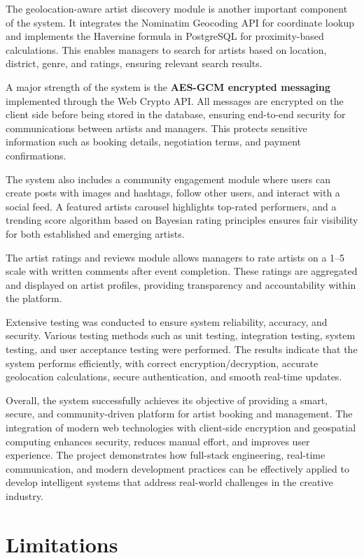 \documentclass[12pt,a4paper]{report}
\begin{document}
The geolocation-aware artist discovery module is another important component of the system. It integrates the Nominatim Geocoding API for coordinate lookup and implements the Haversine formula in PostgreSQL for proximity-based calculations. This enables managers to search for artists based on location, district, genre, and ratings, ensuring relevant search results.

A major strength of the system is the \textbf{AES-GCM encrypted messaging} implemented through the Web Crypto API. All messages are encrypted on the client side before being stored in the database, ensuring end-to-end security for communications between artists and managers. This protects sensitive information such as booking details, negotiation terms, and payment confirmations.

The system also includes a community engagement module where users can create posts with images and hashtags, follow other users, and interact with a social feed. A featured artists carousel highlights top-rated performers, and a trending score algorithm based on Bayesian rating principles ensures fair visibility for both established and emerging artists.

The artist ratings and reviews module allows managers to rate artists on a 1--5 scale with written comments after event completion. These ratings are aggregated and displayed on artist profiles, providing transparency and accountability within the platform.

Extensive testing was conducted to ensure system reliability, accuracy, and security. Various testing methods such as unit testing, integration testing, system testing, and user acceptance testing were performed. The results indicate that the system performs efficiently, with correct encryption/decryption, accurate geolocation calculations, secure authentication, and smooth real-time updates.

Overall, the system successfully achieves its objective of providing a smart, secure, and community-driven platform for artist booking and management. The integration of modern web technologies with client-side encryption and geospatial computing enhances security, reduces manual effort, and improves user experience. The project demonstrates how full-stack engineering, real-time communication, and modern development practices can be effectively applied to develop intelligent systems that address real-world challenges in the creative industry.

\section{Limitations}
\end{document}
